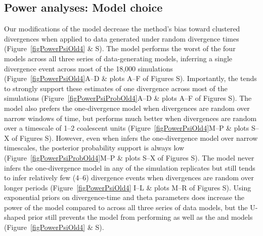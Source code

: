 \subsection*{Power analyses: Model choice}
Our modifications of the \msb model decrease the method's bias toward clustered
divergences when applied to data generated under random divergence times
(Figure~\ref{figPowerPsiOld4} \& 
S).
The \modelOld model performs the worst of the four models across
all three series of data-generating models, inferring a single divergence event across
most of the 18,000 simulations
(Figure~\ref{figPowerPsiOld4}A--D \& plots A--F of Figures
S).
Importantly, the \modelOld tends to strongly support these estimates
of one divergence across most of the simulations
(Figure~\ref{figPowerPsiProbOld4}A--D \& plots A--F of Figures
S).
The \modelDPP model also prefers the one-divergence model 
when divergences are random over narrow windows of time, but
performs much better when divergences are random over a timescale
of 1--2 coalescent units
(Figure~\ref{figPowerPsiOld4}M--P \& plots S--X of Figures
S).
However, even when \modelDPP infers the one-divergence model over narrow
timescales, the posterior probability support is always low
(Figure~\ref{figPowerPsiProbOld4}M--P \& plots S--X of Figures
S).
The \modelUniform model never infers the one-divergence model in any of the
simulation replicates but still tends to infer relatively few (4--6) divergence
events when divergences are random over longer periods 
(Figure~\ref{figPowerPsiOld4} I--L \& plots M--R of Figures
S).
Using exponential priors on divergence-time and theta parameters does increase
the power of the \modelUshaped model compared to \modelOld across all three
series of data models, but the U-shaped prior still prevents the model from
performing as well as the \modelDPP and \modelUniform models 
(Figure~\ref{figPowerPsiOld4} \& 
S).

